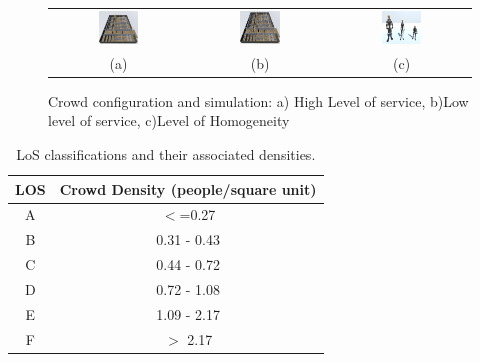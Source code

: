 \begin{figure} 
	\begin{tabular}{c c c} 
	\includegraphics[width=0.31\textwidth]{images/LoS_A_lowest_density.png} & \includegraphics[width=0.31\textwidth]{images/LoS_F_highest_crowd_density.png} & \includegraphics[width=0.31\textwidth]{images/LevelOfHomogeneity.png} \\
	(a) & (b) & (c)
	\end{tabular}
	\caption{\label{fig:crowd-parameter-ex}Crowd configuration and simulation: a) High Level of service, b)Low level of service, c)Level of Homogeneity}
\end{figure}

\begin{table}
	\centering
	\begin{tabular}{||c c ||}
		\hline
		LOS & Crowd Density (people/square unit)\\ [0.5ex] 
		\hline\hline
		A & $<$=0.27  \\ 
		\hline
		B & 0.31 - 0.43 \\
		\hline
		C & 0.44 - 0.72  \\
		\hline
		D & 0.72 - 1.08 \\
		\hline
		E & 1.09 - 2.17 \\
		\hline
		F & $>$ 2.17 \\ 
		\hline
	\end{tabular}
	\caption{LoS classifications and their associated densities.}
	\label{table:los}
\end{table}

